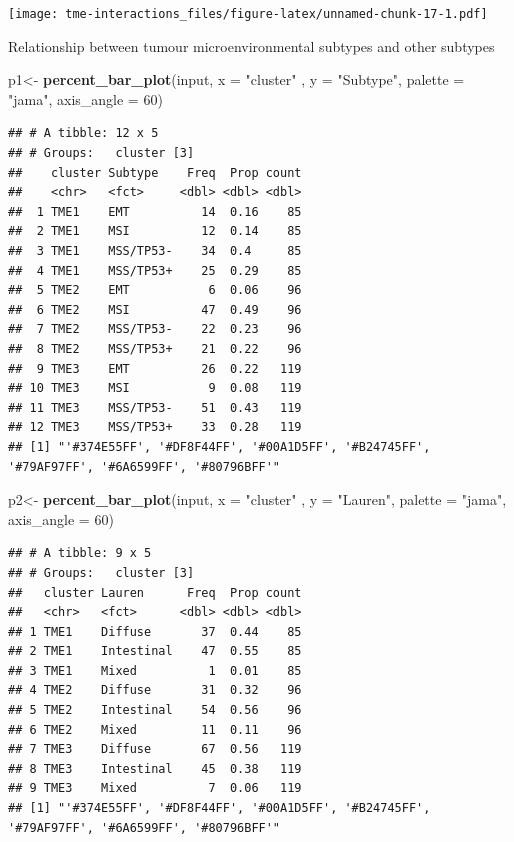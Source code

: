 \documentclass[
  12pt,
]{book}
\newenvironment{Shaded}{\begin{snugshade}}{\end{snugshade}}
\newcommand{\AttributeTok}[1]{\textcolor[rgb]{0.13,0.29,0.53}{#1}}
\newcommand{\DecValTok}[1]{\textcolor[rgb]{0.00,0.00,0.81}{#1}}
\newcommand{\FunctionTok}[1]{\textcolor[rgb]{0.13,0.29,0.53}{\textbf{#1}}}
\newcommand{\NormalTok}[1]{#1}
\newcommand{\OtherTok}[1]{\textcolor[rgb]{0.56,0.35,0.01}{#1}}
\newcommand{\StringTok}[1]{\textcolor[rgb]{0.31,0.60,0.02}{#1}}
\begin{document}
\texttt{[image: tme-interactions\_files/figure-latex/unnamed-chunk-17-1.pdf]}

Relationship between tumour microenvironmental subtypes and other subtypes

\begin{Shaded}
\begin{Highlighting}[]
\NormalTok{p1}\OtherTok{\textless{}{-}} \FunctionTok{percent\_bar\_plot}\NormalTok{(input, }\AttributeTok{x =} \StringTok{"cluster"}\NormalTok{ , }\AttributeTok{y =} \StringTok{"Subtype"}\NormalTok{, }\AttributeTok{palette =} \StringTok{"jama"}\NormalTok{, }\AttributeTok{axis\_angle =} \DecValTok{60}\NormalTok{)}
\end{Highlighting}
\end{Shaded}

\begin{verbatim}
## # A tibble: 12 x 5
## # Groups:   cluster [3]
##    cluster Subtype    Freq  Prop count
##    <chr>   <fct>     <dbl> <dbl> <dbl>
##  1 TME1    EMT          14  0.16    85
##  2 TME1    MSI          12  0.14    85
##  3 TME1    MSS/TP53-    34  0.4     85
##  4 TME1    MSS/TP53+    25  0.29    85
##  5 TME2    EMT           6  0.06    96
##  6 TME2    MSI          47  0.49    96
##  7 TME2    MSS/TP53-    22  0.23    96
##  8 TME2    MSS/TP53+    21  0.22    96
##  9 TME3    EMT          26  0.22   119
## 10 TME3    MSI           9  0.08   119
## 11 TME3    MSS/TP53-    51  0.43   119
## 12 TME3    MSS/TP53+    33  0.28   119
## [1] "'#374E55FF', '#DF8F44FF', '#00A1D5FF', '#B24745FF', '#79AF97FF', '#6A6599FF', '#80796BFF'"
\end{verbatim}

\begin{Shaded}
\begin{Highlighting}[]
\NormalTok{p2}\OtherTok{\textless{}{-}} \FunctionTok{percent\_bar\_plot}\NormalTok{(input, }\AttributeTok{x =} \StringTok{"cluster"}\NormalTok{ , }\AttributeTok{y =} \StringTok{"Lauren"}\NormalTok{, }\AttributeTok{palette =} \StringTok{"jama"}\NormalTok{, }\AttributeTok{axis\_angle =} \DecValTok{60}\NormalTok{)}
\end{Highlighting}
\end{Shaded}

\begin{verbatim}
## # A tibble: 9 x 5
## # Groups:   cluster [3]
##   cluster Lauren      Freq  Prop count
##   <chr>   <fct>      <dbl> <dbl> <dbl>
## 1 TME1    Diffuse       37  0.44    85
## 2 TME1    Intestinal    47  0.55    85
## 3 TME1    Mixed          1  0.01    85
## 4 TME2    Diffuse       31  0.32    96
## 5 TME2    Intestinal    54  0.56    96
## 6 TME2    Mixed         11  0.11    96
## 7 TME3    Diffuse       67  0.56   119
## 8 TME3    Intestinal    45  0.38   119
## 9 TME3    Mixed          7  0.06   119
## [1] "'#374E55FF', '#DF8F44FF', '#00A1D5FF', '#B24745FF', '#79AF97FF', '#6A6599FF', '#80796BFF'"
\end{verbatim}
\end{document}
